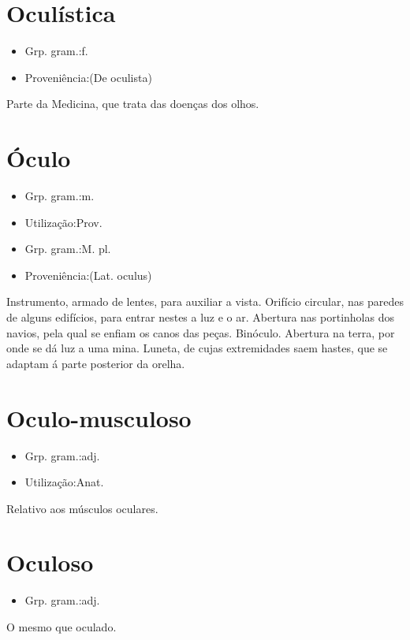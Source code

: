 \section{Oculística}
\begin{itemize}
\item {Grp. gram.:f.}
\end{itemize}
\begin{itemize}
\item {Proveniência:(De \textunderscore oculista\textunderscore )}
\end{itemize}
Parte da Medicina, que trata das doenças dos olhos.
\section{Óculo}
\begin{itemize}
\item {Grp. gram.:m.}
\end{itemize}
\begin{itemize}
\item {Utilização:Prov.}
\end{itemize}
\begin{itemize}
\item {Grp. gram.:M. pl.}
\end{itemize}
\begin{itemize}
\item {Proveniência:(Lat. \textunderscore oculus\textunderscore )}
\end{itemize}
Instrumento, armado de lentes, para auxiliar a vista.
Orifício circular, nas paredes de alguns edifícios, para entrar nestes a luz e o ar.
Abertura nas portinholas dos navios, pela qual se enfiam os canos das peças.
Binóculo.
Abertura na terra, por onde se dá luz a uma mina.
Luneta, de cujas extremidades saem hastes, que se adaptam á parte posterior da orelha.
\section{Oculo-musculoso}
\begin{itemize}
\item {Grp. gram.:adj.}
\end{itemize}
\begin{itemize}
\item {Utilização:Anat.}
\end{itemize}
Relativo aos músculos oculares.
\section{Oculoso}
\begin{itemize}
\item {Grp. gram.:adj.}
\end{itemize}
O mesmo que \textunderscore oculado\textunderscore .
